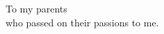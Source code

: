 \begin{dedication}
{\large{To my parents}}\\[2mm]
who passed on their passions to me.
\end{dedication}
